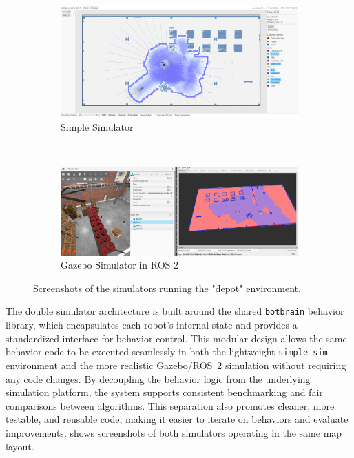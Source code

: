 \def\w{0.95\textwidth}
\begin{figure}[H]
    \centering
    \begin{subfigure}[b]{\w}
        \centering
        \includegraphics[width=\textwidth]{./figures/screenshots/simple_sim_depot.png}
        \caption{Simple Simulator}
        \label{fig:simple_sim}
    \end{subfigure} \\
    \vspace{3mm}
    \begin{subfigure}[b]{\w}
        \centering
        \includegraphics[width=\textwidth]{./figures/screenshots/gazebo_sim_depot.png}
        \caption{Gazebo Simulator in ROS 2}
        \label{fig:gazebo_sim}
    \end{subfigure}
    \caption{Screenshots of the simulators running the "depot" environment.}
    \label{fig:simulators}
\end{figure}

The double simulator architecture is built around the shared \texttt{botbrain} behavior library, which encapsulates each robot’s internal state and provides a standardized interface for behavior control. This modular design allows the same behavior code to be executed seamlessly in both the lightweight \texttt{simple\_sim} environment and the more realistic Gazebo/ROS~2 simulation without requiring any code changes. By decoupling the behavior logic from the underlying simulation platform, the system supports consistent benchmarking and fair comparisons between algorithms. This separation also promotes cleaner, more testable, and reusable code, making it easier to iterate on behaviors and evaluate improvements.
 shows screenshots of both simulators operating in the same map layout.
